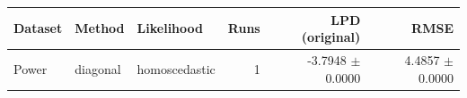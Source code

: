 \begin{tabular}{lllrrr}
\toprule
Dataset & Method & Likelihood & Runs & LPD (original) & RMSE \\
\midrule
Power & diagonal & homoscedastic & 1 & -3.7948 $\pm$ 0.0000 & 4.4857 $\pm$ 0.0000 \\
\bottomrule
\end{tabular}

